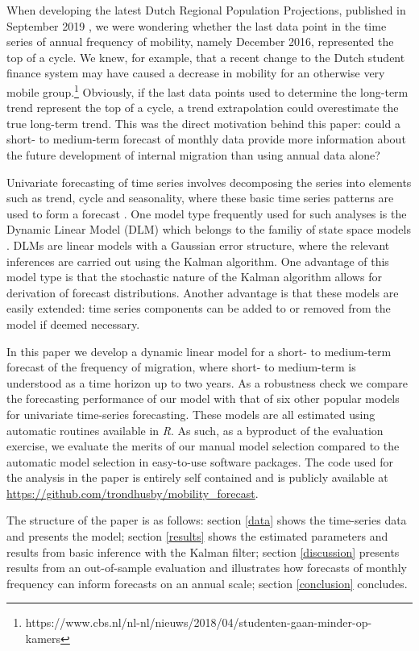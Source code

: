 \documentclass[12pt, a4paper]{article}
\begin{document}
When developing the latest Dutch Regional Population Projections,
published in September 2019 \citep{teriele2019}, we were wondering
whether the last data point in the time series of annual frequency of
mobility, namely December 2016, represented the top of a
cycle. We knew, for example, that a recent change to the Dutch student
finance system may have caused a decrease in mobility for an
otherwise very mobile
group.\footnote{https://www.cbs.nl/nl-nl/nieuws/2018/04/studenten-gaan-minder-op-kamers}
 Obviously, if the last data points used to determine
the long-term trend represent the top of a cycle, a trend extrapolation
could overestimate the true long-term trend. This was the direct motivation behind this paper: could a short- to medium-term forecast of monthly data provide more information about the future development of internal migration than using annual data alone?

Univariate forecasting of time series involves decomposing the series into elements such as trend, cycle and seasonality, where these basic time series patterns are used to form a forecast \citep{zietz2014us}. One model type frequently used for such analyses is the Dynamic Linear Model (DLM) which belongs to the familiy of state space models \citep{petris2009dynamic, durbin2012time}. DLMs are linear models with a Gaussian error structure, where the relevant inferences are carried out using the Kalman algorithm. One advantage of this model type is that the stochastic nature of the Kalman algorithm allows for derivation of forecast distributions. Another advantage is that these models are easily extended: time series components can be added to or removed from the model if deemed necessary. 

In this paper we develop a dynamic linear model for a short- to medium-term forecast of the frequency of migration, where short- to medium-term is understood as a time horizon up to two years. As a robustness check we compare the forecasting performance of our model with that of six other popular models for univariate time-series forecasting. These models are all estimated using automatic routines available
in \emph{R}. As such, as a byproduct of the evaluation exercise, we
evaluate the merits of our manual model selection compared to the
automatic model selection in easy-to-use software packages. The code used for the analysis in the paper is entirely self contained and is publicly available at \url{https://github.com/trondhusby/mobility_forecast}.

The structure of the paper is as follows: section \ref{data} shows the time-series data and presents the model; section \ref{results} shows the estimated parameters and results from basic inference with the Kalman filter; section \ref{discussion} presents results from an out-of-sample evaluation and illustrates how forecasts of monthly frequency can inform forecasts on an annual scale; section \ref{conclusion} concludes.
\end{document}
